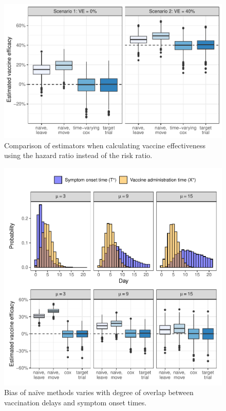 \begin{appendices}
\begin{refsection}
    \begin{figure}[p]
        \centering
        \includegraphics{../../../../3_figures/sim_hr.pdf}
        \caption{Comparison of estimators when calculating vaccine effectiveness using the hazard ratio instead of the risk ratio.\label{fig:sim_hr}}
    \end{figure}

    \begin{figure}[p]
        \centering
        \includegraphics{../../../../3_figures/sim_overlap.pdf}
        \caption{Bias of na\"{i}ve methods varies with degree of overlap between vaccination delays and symptom onset times.\label{fig:sim_overlap}}
    \end{figure}


\end{refsection}
\end{appendices}
